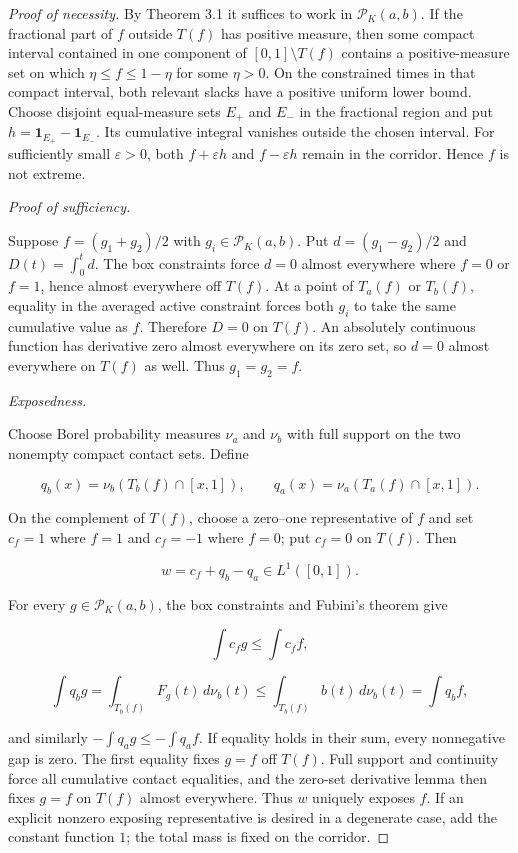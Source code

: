 \documentclass[11pt]{article}
\numberwithin{equation}{section}
\begin{document}
\begin{proof}[Proof of necessity]

By Theorem 3.1 it suffices to work in $\mathcal P_K(a,b)$. If the fractional part of
$f$ outside $T(f)$ has positive measure, then some compact interval contained in one
component of $[0,1]\setminus T(f)$ contains a positive-measure set on which
$\eta\le f\le1-\eta$ for some $\eta>0$. On the constrained times in that compact
interval, both relevant slacks have a positive uniform lower bound. Choose disjoint
equal-measure sets $E_+$ and $E_-$ in the fractional region and put
$h=\mathbf1_{E_+}-\mathbf1_{E_-}$. Its cumulative integral vanishes outside the
chosen interval. For sufficiently small $\varepsilon>0$, both
$f+\varepsilon h$ and $f-\varepsilon h$ remain in the corridor. Hence $f$ is not
extreme.

\medskip
\noindent\emph{Proof of sufficiency.}


Suppose $f=(g_1+g_2)/2$ with $g_i\in\mathcal P_K(a,b)$. Put
$d=(g_1-g_2)/2$ and $D(t)=\int_0^t d$. The box constraints force $d=0$ almost
everywhere where $f=0$ or $f=1$, hence almost everywhere off $T(f)$. At a point of
$T_a(f)$ or $T_b(f)$, equality in the averaged active constraint forces both $g_i$ to
take the same cumulative value as $f$. Therefore $D=0$ on $T(f)$. An absolutely
continuous function has derivative zero almost everywhere on its zero set, so $d=0$
almost everywhere on $T(f)$ as well. Thus $g_1=g_2=f$.

\medskip
\noindent\emph{Exposedness.}


Choose Borel probability measures $\nu_a$ and $\nu_b$ with full support on the two
nonempty compact contact sets. Define

\nopagebreak[4]
\[
q_b(x)=\nu_b(T_b(f)\cap[x,1]),\qquad
q_a(x)=\nu_a(T_a(f)\cap[x,1]).
\]

On the complement of $T(f)$, choose a zero--one representative of $f$ and set
$c_f=1$ where $f=1$ and $c_f=-1$ where $f=0$; put $c_f=0$ on $T(f)$. Then

\nopagebreak[4]
\[
w=c_f+q_b-q_a\in L^1([0,1]).
\]

For every $g\in\mathcal P_K(a,b)$, the box constraints and Fubini's theorem give

\nopagebreak[4]
\[
\int c_fg\le\int c_ff,
\]

\nopagebreak[4]
\[
\int q_bg
=\int_{T_b(f)}F_g(t)\,d\nu_b(t)
\le\int_{T_b(f)}b(t)\,d\nu_b(t)
=\int q_bf,
\]

and similarly $-\int q_ag\le-\int q_af$. If equality holds in their sum, every
nonnegative gap is zero. The first equality fixes $g=f$ off $T(f)$. Full support and
continuity force all cumulative contact equalities, and the zero-set derivative lemma
then fixes $g=f$ on $T(f)$ almost everywhere. Thus $w$ uniquely exposes $f$. If an
explicit nonzero exposing representative is desired in a degenerate case, add the
constant function $1$; the total mass is fixed on the corridor.
\end{proof}
\end{document}
